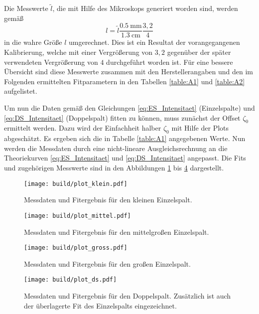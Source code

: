 Die Messwerte $\tilde{l}$, die mit Hilfe des Mikroskops generiert worden sind, werden gemäß
\begin{equation}
  l = \tilde{l} \frac{\SI{0.5}{\milli\meter}}{\SI{1.3}{\centi\meter}} \frac{3,2}{4}
\end{equation}
in die wahre Größe $l$ umgerechnet. Dies ist ein Resultat der vorangegangenen Kalibrierung, welche mit einer Vergrößerung von $3,2$ gegenüber der später verwendeten Vergrößerung von $4$ durchgeführt worden ist. Für eine bessere Übersicht sind diese Messwerte zusammen mit den Herstellerangaben und den im Folgenden ermittelten Fitparametern in den Tabellen \ref{table:A1} und \ref{table:A2} aufgelistet.


Um nun die Daten gemäß den Gleichungen \eqref{eq:ES_Intensitaet} (Einzelspalte) und \eqref{eq:DS_Intensitaet} (Doppelspalt) fitten zu können, muss zunächst der Offset $\zeta_0$ ermittelt werden. Dazu wird der Einfachheit halber $\zeta_0$ mit Hilfe der Plots abgeschätzt. Es ergeben sich die in Tabelle \ref{table:A1} angegebenen Werte. Nun werden die Messdaten durch eine nicht-lineare Ausgleichsrechnung an die Theoriekurven \eqref{eq:ES_Intensitaet} und \eqref{eq:DS_Intensitaet} angepasst. Die Fits und zugehörigen Messwerte sind in den Abbildungen \ref{fig:A1} bis \ref{fig:A4} dargestellt.
\begin{figure}
  \centering
  \texttt{[image: build/plot\_klein.pdf]}
  \caption{Messdaten und Fitergebnis für den kleinen Einzelspalt.}
  \label{fig:A1}
\end{figure}
\begin{figure}
  \centering
  \texttt{[image: build/plot\_mittel.pdf]}
  \caption{Messdaten und Fitergebnis für den mittelgroßen Einzelspalt.}
  \label{fig:A2}
\end{figure}
\begin{figure}
  \centering
  \texttt{[image: build/plot\_gross.pdf]}
  \caption{Messdaten und Fitergebnis für den großen Einzelspalt.}
  \label{fig:A3}
\end{figure}
\begin{figure}
  \centering
  \texttt{[image: build/plot\_ds.pdf]}
  \caption{Messdaten und Fitergebnis für den Doppelspalt. Zusätzlich ist auch der überlagerte Fit des Einzelspalts eingezeichnet.}
  \label{fig:A4}
\end{figure}
%
